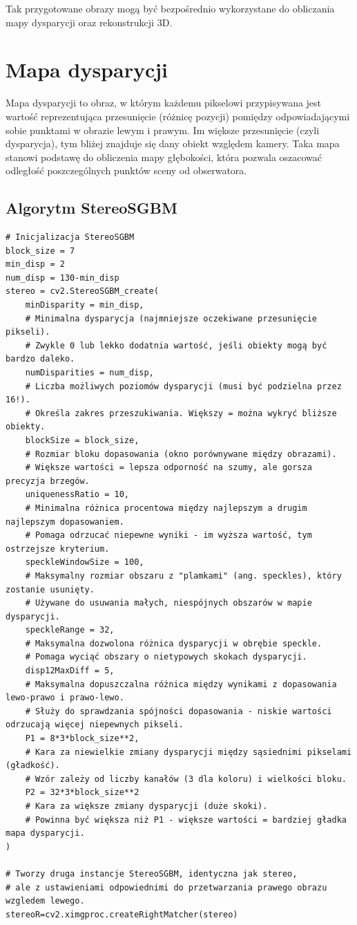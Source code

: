 \documentclass[magisterska]{pracadypl}
\begin{document}
Tak przygotowane obrazy mogą być bezpośrednio wykorzystane do obliczania mapy dysparycji oraz rekonstrukcji 3D.

\section{Mapa dysparycji}

Mapa dysparycji \cite{disparity} to obraz, w którym każdemu pikselowi przypisywana jest wartość reprezentująca przesunięcie (różnicę pozycji) pomiędzy odpowiadającymi sobie punktami w obrazie lewym i prawym. Im większe przesunięcie (czyli dysparycja), tym bliżej znajduje się dany obiekt względem kamery. Taka mapa stanowi podstawę do obliczenia mapy głębokości, która pozwala oszacować odległość poszczególnych punktów sceny od obserwatora.

\subsection*{Algorytm StereoSGBM}

\begin{lstlisting}[style=mypython]
# Inicjalizacja StereoSGBM
block_size = 7
min_disp = 2
num_disp = 130-min_disp
stereo = cv2.StereoSGBM_create(
    minDisparity = min_disp,
    # Minimalna dysparycja (najmniejsze oczekiwane przesunięcie pikseli).
    # Zwykle 0 lub lekko dodatnia wartość, jeśli obiekty mogą być bardzo daleko.
    numDisparities = num_disp,
    # Liczba możliwych poziomów dysparycji (musi być podzielna przez 16!).
    # Określa zakres przeszukiwania. Większy = można wykryć bliższe obiekty.
    blockSize = block_size,
    # Rozmiar bloku dopasowania (okno porównywane między obrazami).
    # Większe wartości = lepsza odporność na szumy, ale gorsza precyzja brzegów.
    uniquenessRatio = 10,
    # Minimalna różnica procentowa między najlepszym a drugim najlepszym dopasowaniem.
    # Pomaga odrzucać niepewne wyniki - im wyższa wartość, tym ostrzejsze kryterium.
    speckleWindowSize = 100,
    # Maksymalny rozmiar obszaru z "plamkami" (ang. speckles), który zostanie usunięty.
    # Używane do usuwania małych, niespójnych obszarów w mapie dysparycji.
    speckleRange = 32,
    # Maksymalna dozwolona różnica dysparycji w obrębie speckle.
    # Pomaga wyciąć obszary o nietypowych skokach dysparycji.
    disp12MaxDiff = 5,
    # Maksymalna dopuszczalna różnica między wynikami z dopasowania lewo-prawo i prawo-lewo.
    # Służy do sprawdzania spójności dopasowania - niskie wartości odrzucają więcej niepewnych pikseli.
    P1 = 8*3*block_size**2,
    # Kara za niewielkie zmiany dysparycji między sąsiednimi pikselami (gładkość).
    # Wzór zależy od liczby kanałów (3 dla koloru) i wielkości bloku.
    P2 = 32*3*block_size**2
    # Kara za większe zmiany dysparycji (duże skoki).
    # Powinna być większa niż P1 - większe wartości = bardziej gładka mapa dysparycji.
)

# Tworzy druga instancje StereoSGBM, identyczna jak stereo,
# ale z ustawieniami odpowiednimi do przetwarzania prawego obrazu wzgledem lewego.
stereoR=cv2.ximgproc.createRightMatcher(stereo)
\end{lstlisting}
\end{document}
